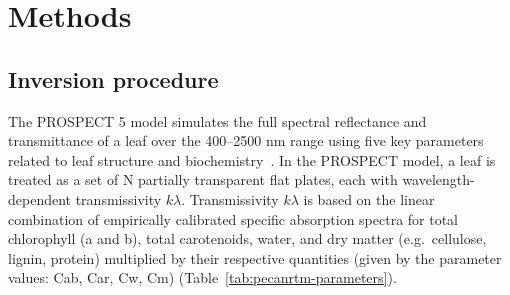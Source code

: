 \section{Methods}\label{sec:pecanrtm-methods}

\subsection{Inversion procedure}

The PROSPECT 5 model simulates the full spectral reflectance and transmittance of a leaf over the 400--2500 nm range using five key parameters related to leaf structure and biochemistry~\cite{feret_2008_prospect}.
In the PROSPECT model, a leaf is treated as a set of N partially transparent flat plates, each with wavelength-dependent transmissivity $k\lambda$.
Transmissivity $k\lambda$ is based on the linear combination of empirically calibrated specific absorption spectra for total chlorophyll (a and b), total carotenoids, water, and dry matter (e.g.\ cellulose, lignin, protein) multiplied by their respective quantities (given by the parameter values: Cab, Car, Cw, Cm) (Table~\ref{tab:pecanrtm-parameters}). %

\begin{table}
  \caption{%
    Summary of PROSPECT 5 parameters.
    Ranges for Car, Cw, and Cm are based on the datasets used for their calibration (ANGERS for Cab and Car, LOPEX for Cw and Cm) as reported in Feret et al.~(2008).
    The ranges for N and Cab are calculated from the LOPEX and ANGERS databases, respectively.
    Units for Cw and Cm are adjusted for readability (original units are g cm$^{-2}$).
  }\label{tab:pecanrtm-parameters}
\end{table}

